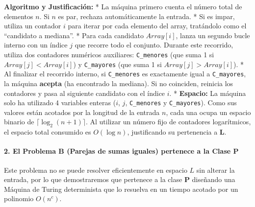 \documentclass[12pt]{book} %
\begin{document}
\textbf{Algoritmo y Justificación:} * La máquina primero cuenta el
número total de elementos \(n\). Si \(n\) es par, rechaza
automáticamente la entrada. * Si es impar, utiliza un contador \(i\)
para iterar por cada elemento del array, tratándolo como el ``candidato
a mediana''. * Para cada candidato \(Array[i]\), lanza un segundo bucle
interno con un índice \(j\) que recorre todo el conjunto. Durante este
recorrido, utiliza dos contadores numéricos auxiliares:
\texttt{C\_menores} (que suma 1 si \(Array[j] < Array[i]\)) y
\texttt{C\_mayores} (que suma 1 si \(Array[j] > Array[i]\)). * Al
finalizar el recorrido interno, si \texttt{C\_menores} es exactamente
igual a \texttt{C\_mayores}, la máquina \textbf{acepta} (ha encontrado
la mediana). Si no coinciden, reinicia los contadores y pasa al
siguiente candidato con el índice \(i\). * \textbf{Espacio:} La máquina
solo ha utilizado 4 variables enteras (\(i\), \(j\), \texttt{C\_menores}
y \texttt{C\_mayores}). Como sus valores están acotados por la longitud
de la entrada \(n\), cada una ocupa un espacio binario de
\(\lceil \log_2(n+1) \rceil\). Al utilizar un número fijo de contadores
logarítmicos, el espacio total consumido es \textbf{\(O(\log n)\)},
justificando su pertenencia a \textbf{L}.

\hypertarget{el-problema-b-parejas-de-sumas-iguales-pertenece-a-la-clase-p}{%
\paragraph{\texorpdfstring{\textbf{2. El Problema B (Parejas de sumas
iguales) pertenece a la Clase
P}}{2. El Problema B (Parejas de sumas iguales) pertenece a la Clase P}}\label{el-problema-b-parejas-de-sumas-iguales-pertenece-a-la-clase-p}}

Este problema no se puede resolver eficientemente en espacio \(L\) sin
alterar la entrada, por lo que demostraremos que pertenece a la clase
\textbf{P} diseñando una Máquina de Turing determinista que lo resuelva
en un tiempo acotado por un polinomio \(O(n^c)\).
\end{document}
